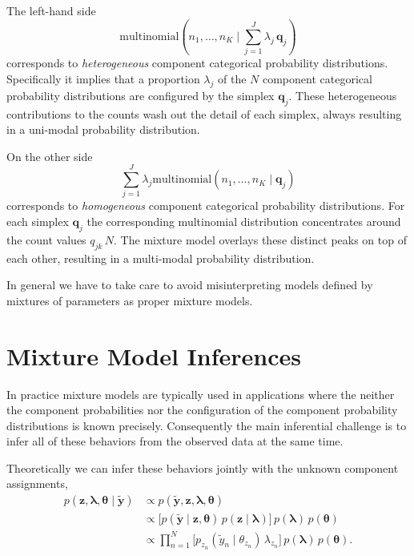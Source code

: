 \documentclass[
  letterpaper,
  DIV=11,
  numbers=noendperiod]{scrartcl}
\begin{document}
The left-hand side \[
\mathrm{multinomial}( n_{1}, \ldots, n_{K} \mid
\textstyle \sum_{j = 1}^{J} \lambda_{j} \, \mathbf{q}_{j} )
\] corresponds to \emph{heterogeneous} component categorical probability
distributions. Specifically it implies that a proportion \(\lambda_{j}\)
of the \(N\) component categorical probability distributions are
configured by the simplex \(\mathbf{q}_{j}\). These heterogeneous
contributions to the counts wash out the detail of each simplex, always
resulting in a uni-modal probability distribution.

On the other side \[
\sum_{j = 1}^{J} \lambda_{j}
\mathrm{multinomial}( n_{1}, \ldots, n_{K} \mid \mathbf{q}_{j})
\] corresponds to \emph{homogeneous} component categorical probability
distributions. For each simplex \(\mathbf{q}_{j}\) the corresponding
multinomial distribution concentrates around the count values
\(q_{jk} \, N\). The mixture model overlays these distinct peaks on top
of each other, resulting in a multi-modal probability distribution.

In general we have to take care to avoid misinterpreting models defined
by mixtures of parameters as proper mixture models.

\section{Mixture Model Inferences}\label{mixture-model-inferences}

In practice mixture models are typically used in applications where the
neither the component probabilities nor the configuration of the
component probability distributions is known precisely. Consequently the
main inferential challenge is to infer all of these behaviors from the
observed data at the same time.

Theoretically we can infer these behaviors jointly with the unknown
component assignments, \begin{align*}
p(\mathbf{z}, \boldsymbol{\lambda}, \boldsymbol{\theta}
 \mid \tilde{\mathbf{y}} )
&\propto
p(\tilde{\mathbf{y}}, \mathbf{z},
  \boldsymbol{\lambda}, \boldsymbol{\theta} )
\\
&\propto
\bigg[
p(\tilde{\mathbf{y}} \mid \mathbf{z}, \boldsymbol{\theta} ) \,
p( \mathbf{z} \mid \boldsymbol{\lambda} )
\bigg] \,
p( \boldsymbol{\lambda} ) \, p( \boldsymbol{\theta} )
\\
&\propto
\prod_{n = 1}^{N} \bigg[
p_{z_{n}}(\tilde{y}_{n} \mid \theta_{z_{n}} ) \, \lambda_{z_{n}}
\bigg] \,
p( \boldsymbol{\lambda} ) \, p( \boldsymbol{\theta} ).
\end{align*}
\end{document}
